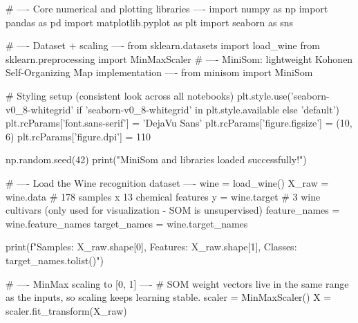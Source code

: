 
\begin{codebox}[title={Core numerical and plotting libraries}]
# ---- Core numerical and plotting libraries ----
import numpy as np
import pandas as pd
import matplotlib.pyplot as plt
import seaborn as sns

# ---- Dataset + scaling ----
from sklearn.datasets import load_wine
from sklearn.preprocessing import MinMaxScaler
# ---- MiniSom: lightweight Kohonen Self-Organizing Map implementation ----
from minisom import MiniSom

# Styling setup (consistent look across all notebooks)
plt.style.use('seaborn-v0_8-whitegrid' if 'seaborn-v0_8-whitegrid' in plt.style.available else 'default')
plt.rcParams['font.sans-serif'] = 'DejaVu Sans'
plt.rcParams['figure.figsize'] = (10, 6)
plt.rcParams['figure.dpi'] = 110

np.random.seed(42)
print("MiniSom and libraries loaded successfully!")

# ---- Load the Wine recognition dataset ----
wine = load_wine()
X_raw = wine.data          # 178 samples x 13 chemical features
y = wine.target            # 3 wine cultivars (only used for visualization - SOM is unsupervised)
feature_names = wine.feature_names
target_names = wine.target_names

print(f"Samples: {X_raw.shape[0]}, Features: {X_raw.shape[1]}, Classes: {target_names.tolist()}")

# ---- MinMax scaling to [0, 1] ----
# SOM weight vectors live in the same range as the inputs, so scaling keeps learning stable.
scaler = MinMaxScaler()
X = scaler.fit_transform(X_raw)
\end{codebox}

